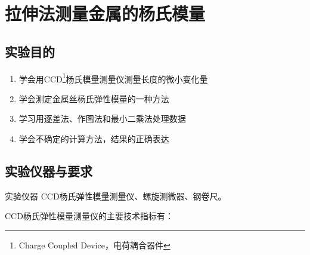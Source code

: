 \documentclass[UTF8]{article}
\theoremstyle{MyLineTheoremStyle} %
\theoremstyle{MyBlockTheoremStyle} %
\theoremstyle{MySubsubsectionStyle} %
\begin{document}

\newpage
{}






\section{拉伸法测量金属的杨氏模量}\thispagestyle{fancy} 

\subsection{实验目的}


\begin{enumerate}
    \item 学会用CCD\footnote{Charge Coupled Device，电荷耦合器件}杨氏模量测量仪测量长度的微小变化量
    \item 学会测定金属丝杨氏弹性模量的一种方法
    \item 学习用逐差法、作图法和最小二乘法处理数据
    \item 学会不确定的计算方法，结果的正确表达
\end{enumerate}

\subsection{实验仪器与要求}
实验仪器 CCD杨氏弹性模量测量仪、螺旋测微器、钢卷尺。

CCD杨氏弹性模量测量仪的主要技术指标有：
\end{document}
